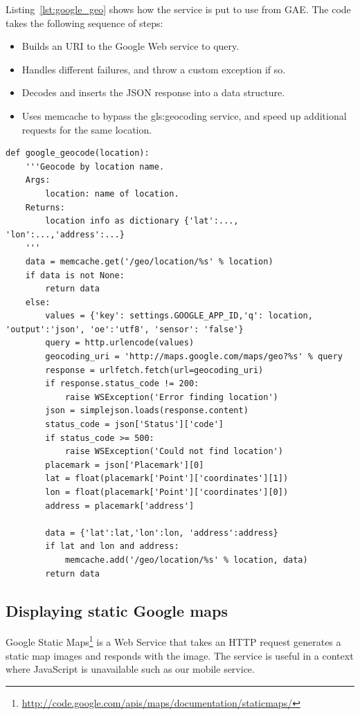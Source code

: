 Listing~\ref{lst:google_geo} shows how the service is put to use from GAE. The
code takes the following sequence of steps:
\begin{itemize}
  \item Builds an URI to the Google Web service to query. 
  \item Handles different failures, and throw a custom exception if so.
  \item Decodes and inserts the JSON response into a data structure.
  \item Uses memcache to bypass the \gls{gls:geocoding} service, and speed up
additional requests for the same location.
\end{itemize}

\begin{lstlisting}[caption=Google geocoding in Python, label=lst:google_geo]
def google_geocode(location):
    '''Geocode by location name.
    Args:
        location: name of location.
    Returns:
        location info as dictionary {'lat':..., 'lon':...,'address':...}
    '''
    data = memcache.get('/geo/location/%s' % location)
    if data is not None:
        return data 
    else:
        values = {'key': settings.GOOGLE_APP_ID,'q': location, 'output':'json', 'oe':'utf8', 'sensor': 'false'}
        query = http.urlencode(values)
        geocoding_uri = 'http://maps.google.com/maps/geo?%s' % query
        response = urlfetch.fetch(url=geocoding_uri)
        if response.status_code != 200:
            raise WSException('Error finding location')
        json = simplejson.loads(response.content)
        status_code = json['Status']['code']
        if status_code >= 500:
            raise WSException('Could not find location')
        placemark = json['Placemark'][0]
        lat = float(placemark['Point']['coordinates'][1])
        lon = float(placemark['Point']['coordinates'][0])
        address = placemark['address']

        data = {'lat':lat,'lon':lon, 'address':address} 
        if lat and lon and address:
            memcache.add('/geo/location/%s' % location, data)
        return data
\end{lstlisting}

\subsection{Displaying static Google maps}
Google Static
Maps\footnote{\url{http://code.google.com/apis/maps/documentation/staticmaps/}} is a
Web Service that takes an HTTP request generates a static map images and responds
with the image. The service is useful in a context where JavaScript is
unavailable such as our mobile service.

